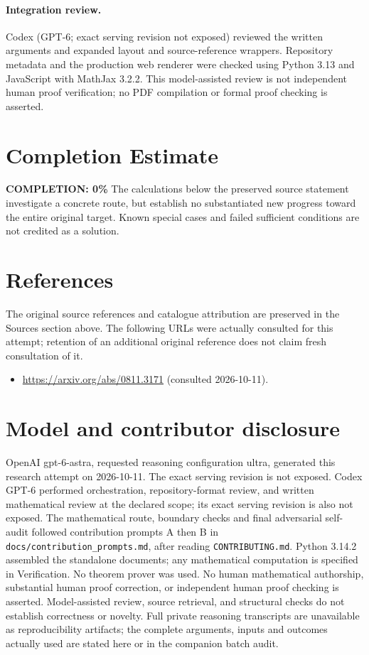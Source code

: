 \documentclass[11pt]{article}
\begin{document}
\paragraph{Integration review.} Codex (GPT-6; exact serving revision not exposed) reviewed the written arguments and expanded layout and source-reference wrappers. Repository metadata and the production web renderer were checked using Python 3.13 and JavaScript with MathJax 3.2.2. This model-assisted review is not independent human proof verification; no PDF compilation or formal proof checking is asserted.

\section{Completion Estimate}
\noindent\textbf{COMPLETION: 0\%}
The calculations below the preserved source statement investigate a concrete route,
but establish no substantiated new progress toward the entire original target.
Known special cases and failed sufficient conditions are not credited as a solution.
\section{References}
The original source references and catalogue attribution are preserved in the
Sources section above. The following URLs were actually consulted for this attempt;
retention of an additional original reference does not claim fresh consultation of it.
\begin{itemize}
\item \url{https://arxiv.org/abs/0811.3171} (consulted 2026-10-11). 
\end{itemize}
\section{Model and contributor disclosure}
OpenAI gpt-6-astra, requested reasoning configuration ultra, generated this research
attempt on 2026-10-11. The exact serving revision is not exposed. Codex GPT-6
performed orchestration, repository-format review, and written mathematical review at the declared scope; its exact serving revision
is also not exposed. The mathematical route, boundary checks and final adversarial
self-audit followed contribution prompts A then B in
\texttt{docs/contribution\_prompts.md}, after reading \texttt{CONTRIBUTING.md}.
Python 3.14.2 assembled the standalone documents; any mathematical computation is
specified in Verification. No theorem prover was used. No human mathematical
authorship, substantial human proof correction, or independent human proof checking
is asserted. Model-assisted review, source retrieval, and structural checks do not
establish correctness or novelty. Full private reasoning transcripts are unavailable
as reproducibility artifacts; the complete arguments, inputs and outcomes actually
used are stated here or in the companion batch audit.
\end{document}
